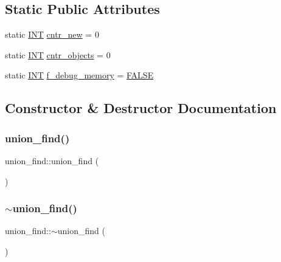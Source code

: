 \subsection*{Static Public Attributes}
\begin{DoxyCompactItemize}
\item 
static \mbox{\hyperlink{galois_8h_a09fddde158a3a20bd2dcadb609de11dc}{I\+NT}} \mbox{\hyperlink{classunion__find_a639b67565be5d7b479f362d773c738ff}{cntr\+\_\+new}} = 0
\item 
static \mbox{\hyperlink{galois_8h_a09fddde158a3a20bd2dcadb609de11dc}{I\+NT}} \mbox{\hyperlink{classunion__find_ac9e4c26ddaf1279e0dc5846ce3b12d21}{cntr\+\_\+objects}} = 0
\item 
static \mbox{\hyperlink{galois_8h_a09fddde158a3a20bd2dcadb609de11dc}{I\+NT}} \mbox{\hyperlink{classunion__find_ad614e9cdd4741f748e953c744892d3bd}{f\+\_\+debug\+\_\+memory}} = \mbox{\hyperlink{nauty_8h_aa93f0eb578d23995850d61f7d61c55c1}{F\+A\+L\+SE}}
\end{DoxyCompactItemize}


\subsection{Constructor \& Destructor Documentation}
\mbox{\label{classunion__find_a34893703c1c2b0168c1a52f5fa67ab46}} 
\subsubsection{\texorpdfstring{union\+\_\+find()}{union\_find()}}
{\footnotesize\ttfamily union\+\_\+find\+::union\+\_\+find (\begin{DoxyParamCaption}{ }\end{DoxyParamCaption})}

\mbox{\label{classunion__find_af04d05ec9b34cb0aa232d50c04efb137}} 
\subsubsection{\texorpdfstring{$\sim$union\+\_\+find()}{~union\_find()}}
{\footnotesize\ttfamily union\+\_\+find\+::$\sim$union\+\_\+find (\begin{DoxyParamCaption}{ }\end{DoxyParamCaption})}




